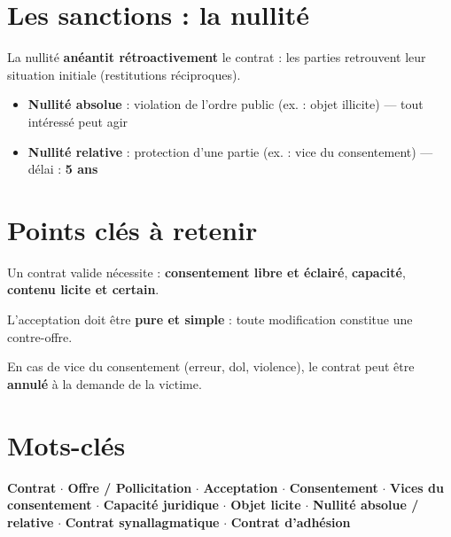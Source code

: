 \documentclass[11pt,a4paper]{article}
\begin{document}
\section*{Les sanctions : la nullité}

\begin{alertbox}
La nullité \textbf{anéantit rétroactivement} le contrat : les parties retrouvent leur situation initiale (restitutions réciproques).
\end{alertbox}

\begin{itemize}
  \item \textbf{Nullité absolue} : violation de l'ordre public (ex. : objet illicite) — tout intéressé peut agir
  \item \textbf{Nullité relative} : protection d'une partie (ex. : vice du consentement) — délai : \textbf{5 ans}
\end{itemize}

\section*{Points clés à retenir}

\begin{keybox}
Un contrat valide nécessite : \textbf{consentement libre et éclairé}, \textbf{capacité}, \textbf{contenu licite et certain}.
\end{keybox}
\vspace{3pt}
\begin{keybox}
L'acceptation doit être \textbf{pure et simple} : toute modification constitue une contre-offre.
\end{keybox}
\vspace{3pt}
\begin{keybox}
En cas de vice du consentement (erreur, dol, violence), le contrat peut être \textbf{annulé} à la demande de la victime.
\end{keybox}

\section*{Mots-clés}
\textcolor{mainColor}{\textbf{Contrat}} $\cdot$
\textcolor{mainColor}{\textbf{Offre / Pollicitation}} $\cdot$
\textcolor{mainColor}{\textbf{Acceptation}} $\cdot$
\textcolor{mainColor}{\textbf{Consentement}} $\cdot$
\textcolor{mainColor}{\textbf{Vices du consentement}} $\cdot$
\textcolor{mainColor}{\textbf{Capacité juridique}} $\cdot$
\textcolor{mainColor}{\textbf{Objet licite}} $\cdot$
\textcolor{mainColor}{\textbf{Nullité absolue / relative}} $\cdot$
\textcolor{mainColor}{\textbf{Contrat synallagmatique}} $\cdot$
\textcolor{mainColor}{\textbf{Contrat d'adhésion}}
\end{document}
